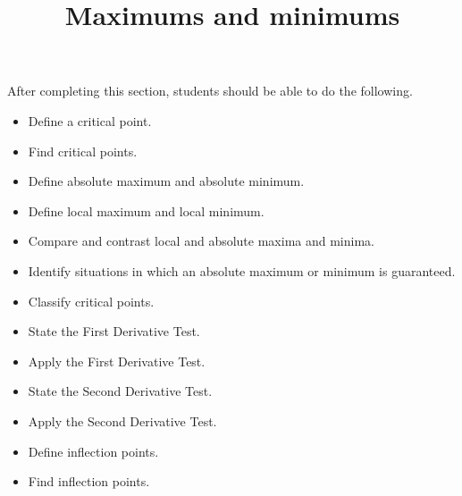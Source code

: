 \documentclass{ximera}
\title{Maximums and minimums}
\begin{document}
\begin{abstract}
\end{abstract}

\maketitle

\begin{sectionOutcomes}

After completing this section, students should be able to do the following.

\begin{itemize}
	\item Define a critical point.
	\item Find critical points.
	\item Define absolute maximum and absolute minimum.
	\item Define local maximum and local minimum.
	\item Compare and contrast local and absolute maxima and minima.
	\item Identify situations in which an absolute maximum or minimum is guaranteed.
	\item Classify critical points.
	\item State the First Derivative Test.
	\item Apply the First Derivative Test.
	\item State the Second Derivative Test.
	\item Apply the Second Derivative Test.
	\item Define inflection points.
	\item Find inflection points.
\end{itemize}

\end{sectionOutcomes}
\end{document}
